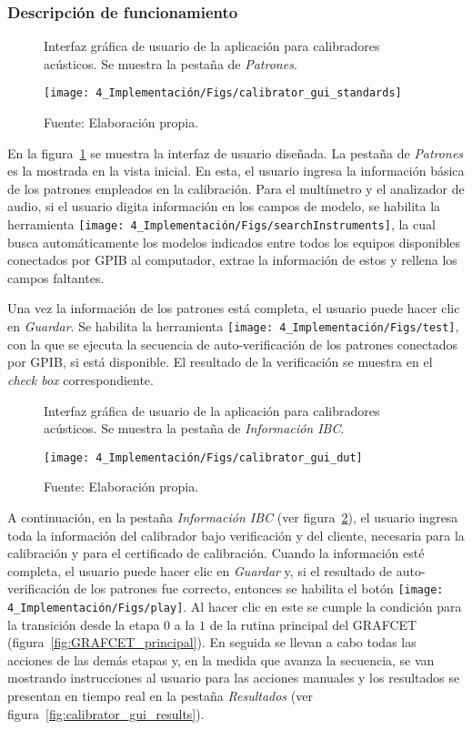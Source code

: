 \subsubsection{Descripción de funcionamiento}
\begin{figure}[!hb]
    \centering
    \caption{Interfaz gráfica de usuario de la aplicación para calibradores acústicos. Se muestra la pestaña de \emph{Patrones}.}
    \label{fig:calibrator_gui_standards}
    \texttt{[image: 4\_Implementación/Figs/calibrator\_gui\_standards]}
    \caption*{\footnotesize Fuente: Elaboración propia.}
\end{figure}
%
En la figura~\ref{fig:calibrator_gui_standards} se muestra la interfaz de usuario diseñada.
La pestaña de \emph{Patrones} es la mostrada en la vista inicial.
En esta, el usuario ingresa la información básica de los patrones empleados en la calibración.
Para el multímetro y el analizador de audio, si el usuario digita información en los campos de modelo, se habilita la herramienta \texttt{[image: 4\_Implementación/Figs/searchInstruments]}, la cual busca automáticamente los modelos indicados entre todos los equipos disponibles conectados por GPIB al computador, extrae la información de estos y rellena los campos faltantes.

Una vez la información de los patrones está completa, el usuario puede hacer clic en \emph{Guardar}.
Se habilita la herramienta \texttt{[image: 4\_Implementación/Figs/test]}, con la que se ejecuta la secuencia de auto-verificación de los patrones conectados por GPIB, si está disponible.
El resultado de la verificación se muestra en el \emph{check box} correspondiente.

\begin{figure}[!h]
    \centering
    \caption{Interfaz gráfica de usuario de la aplicación para calibradores acústicos. Se muestra la pestaña de \emph{Información IBC}.}
    \label{fig:calibrator_gui_dut}
    \texttt{[image: 4\_Implementación/Figs/calibrator\_gui\_dut]}
    \caption*{\footnotesize Fuente: Elaboración propia.}
\end{figure}

A continuación, en la pestaña \emph{Información IBC} (ver figura~\ref{fig:calibrator_gui_dut}), el usuario ingresa toda la información del calibrador bajo verificación y del cliente, necesaria para la calibración y para el certificado de calibración.
Cuando la información esté completa, el usuario puede hacer clic en \emph{Guardar} y, si el resultado de auto-verificación de los patrones fue correcto, entonces se habilita el botón \texttt{[image: 4\_Implementación/Figs/play]}.
Al hacer clic en este se cumple la condición para la transición desde la etapa $0$ a la $1$ de la rutina principal del GRAFCET (figura~\ref{fig:GRAFCET_principal}).
En seguida se llevan a cabo todas las acciones de las demás etapas y, en la medida que avanza la secuencia, se van mostrando instrucciones al usuario para las acciones manuales y los resultados se presentan en tiempo real en la pestaña \emph{Resultados} (ver figura~\ref{fig:calibrator_gui_results}).

